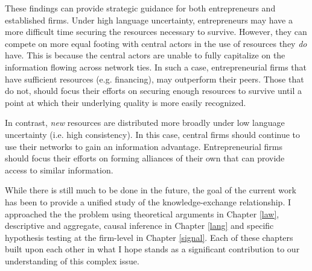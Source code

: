 These findings can provide strategic guidance for both entrepreneurs and established firms. Under high language uncertainty, entrepreneurs may have a more difficult time securing the resources necessary to survive. However, they can compete on more equal footing with central actors in the use of resources they \emph{do} have. This is because the central actors are unable to fully capitalize on the information flowing across network ties. In such a case, entrepreneurial firms that have sufficient resources (e.g. financing), may outperform their peers. Those that do not, should focus their efforts on securing enough resources to survive until a point at which their underlying quality is more easily recognized.

In contrast, \emph{new} resources are distributed more broadly under low language uncertainty (i.e. high consistency). In this case, central firms should continue to use their networks to gain an information advantage. Entrepreneurial firms should focus their efforts on forming alliances of their own that can provide access to similar information.

While there is still much to be done in the future, the goal of the current work has been to provide a unified study of the knowledge-exchange relationship. I approached the the problem using theoretical arguments in Chapter \ref{law}, descriptive and aggregate, causal inference in Chapter \ref{lang} and specific hypothesis testing at the firm-level in Chapter \ref{signal}. Each of these chapters built upon each other in what I hope stands as a significant contribution to our understanding of this complex issue.

